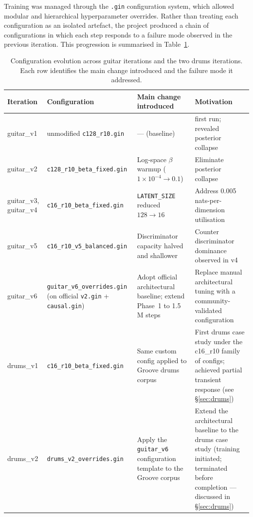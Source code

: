 \documentclass[a4paper,11pt,oneside,openany]{book}
\begin{document}
Training was managed through the \texttt{.gin} configuration system, which allowed modular and hierarchical hyperparameter overrides. Rather than treating each configuration as an isolated artefact, the project produced a chain of configurations in which each step responds to a failure mode observed in the previous iteration. This progression is summarised in Table~\ref{tab:configs}.

\begin{table}[H]
\centering
\caption{Configuration evolution across guitar iterations and the two drums iterations. Each row identifies the main change introduced and the failure mode it addressed.}
\label{tab:configs}
\footnotesize
\setlength{\tabcolsep}{5pt}
\begin{tabularx}{\textwidth}{@{}>{\raggedright\arraybackslash}p{2.0cm}>{\raggedright\arraybackslash}X>{\raggedright\arraybackslash}X>{\raggedright\arraybackslash}X@{}}
\toprule
\textbf{Iteration} & \textbf{Configuration} & \textbf{Main change introduced} & \textbf{Motivation} \\
\midrule
guitar\_v1 & unmodified \texttt{c128\_r10.gin} & --- (baseline) & first run; revealed posterior collapse \\
guitar\_v2 & \texttt{c128\_r10\_beta\_fixed.gin} & Log-space $\beta$ warmup ($1\times10^{-4} \rightarrow 0.1$) & Eliminate posterior collapse \\
guitar\_v3, guitar\_v4 & \texttt{c16\_r10\_beta\_fixed.gin} & \texttt{LATENT\_SIZE} reduced $128 \rightarrow 16$ & Address 0.005 nats-per-dimension utilisation \\
guitar\_v5 & \texttt{c16\_r10\_v5\_balanced.gin} & Discriminator capacity halved and shallower & Counter discriminator dominance observed in v4 \\
guitar\_v6 & \texttt{guitar\_v6\_overrides.gin} (on official \texttt{v2.gin} + \texttt{causal.gin}) & Adopt official architectural baseline; extend Phase~1 to 1.5\,M steps & Replace manual architectural tuning with a community-validated configuration \\
drums\_v1 & \texttt{c16\_r10\_beta\_fixed.gin} & Same custom config applied to Groove drums corpus & First drums case study under the c16\_r10 family of configs; achieved partial transient response (see \S\ref{sec:drums}) \\
drums\_v2 & \texttt{drums\_v2\_overrides.gin} & Apply the \texttt{guitar\_v6} configuration template to the Groove corpus & Extend the architectural baseline to the drums case study (training initiated; terminated before completion --- discussed in \S\ref{sec:drums}) \\
\bottomrule
\end{tabularx}
\end{table}
\end{document}
